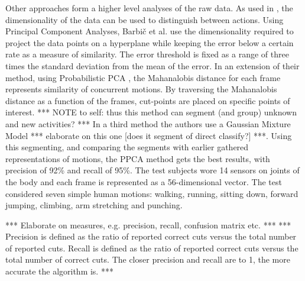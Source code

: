 Other approaches form a higher level analyses of the raw data.
As used in \cite{barbivc2004segmenting}, the dimensionality of the data can be used to distinguish between actions.
Using Principal Component Analyses, Barbi{\v{c}} et al. use the dimensionality required to project the data points on a hyperplane while keeping the error below a certain rate as a measure of similarity.
The error threshold is fixed as a range of three times the standard deviation from the mean of the error.
In an extension of their method, using Probabilistic PCA \cite{tipping1999probabilistic}, the Mahanalobis distance \cite{duda1995pattern} for each frame represents similarity of concurrent motions.
By traversing the Mahanalobis distance as a function of the frames, cut-points are placed on specific points of interest.
*** NOTE to self: thus this method can segment (and group) unknown and new activities? ***
In a third method the authors use a Gaussian Mixture Model *** elaborate on this one [does it segment of direct classify?] ***.
Using this segmenting, and comparing the segments with earlier gathered representations of motions, the PPCA method gets the best results, with precision of 92\% and recall of 95\%.
The test subjects wore 14 sensors on joints of the body and each frame is represented as a 56-dimensional vector.
The test considered seven simple human motions: walking, running, sitting down, forward jumping, climbing, arm stretching and punching.





*** Elaborate on measures, e.g. precision, recall, confusion matrix etc.  ***
*** Precision is defined as the ratio of reported correct cuts versus the total number of reported cuts. Recall is defined as the ratio of reported correct cuts versus the total number of correct cuts. The closer precision and recall are to 1, the more accurate the algorithm is. ***
